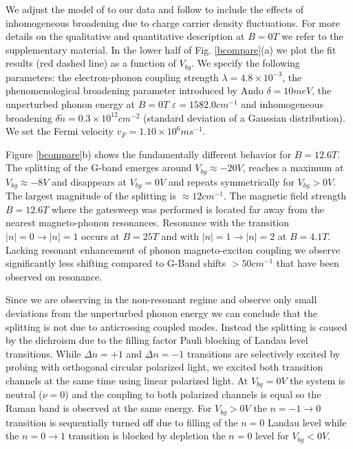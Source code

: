 \documentclass[prl,aps,superscriptaddress,showpacs,reprint]{revtex4-1}
\begin{document}
We adjust the model of \cite{tsuneya2006anomaly} to our data and follow \cite{yan2007electric} to include the effects of inhomogeneous broadening due to charge carrier density fluctuations. For more details on the qualitative and quantitative description at $B=0T$ we refer to the supplementary material. In the lower half of Fig. \ref{bcompare}(a) we plot the fit results (red dashed line) as a function of $V_{bg}$. We specify the following parameters: the electron-phonon coupling strength $\lambda = 4.8\times 10^{-3}$, the phenomenological broadening parameter introduced by Ando \cite{tsuneya2006anomaly} $\delta=10meV$, the unperturbed phonon energy at $B=0T$ $\varepsilon=1582.0cm^{-1}$ and inhomogeneous broadening $\delta \widetilde{n}=0.3\times 10^{12}cm^{-2}$ (standard deviation of a Gaussian distribution). We set the Fermi velocity $v_F=1.10\times 10^6ms^{-1}$.

Figure \ref{bcompare}b) shows the fundamentally different behavior for $B=12.6T$. 
The splitting of the G-band emerges around $V_{bg} \approx -20V$, reaches a maximum at $V_{bg} \approx -8V$ and disappears at $V_{bg} = 0V$ and repeats symmetrically for $V_{bg}>0V$. The largest magnitude of the splitting is $\approx 12cm^{-1}$. The magnetic field strength $B=12.6T$ where the gatesweep was performed is located far away from the nearest magneto-phonon resonances. Resonance with the transition $\left|n\right|=0 \rightarrow \left|n\right|=1$ occurs at $B=25T$ and with $\left|n\right|=1 \rightarrow \left|n\right|=2$ at $B=4.1T$. Lacking resonant enhancement of phonon magneto-exciton coupling we observe significantly less shifting compared to G-Band shifts $>50cm^{-1}$ that have been observed on resonance. 

Since we are observing in the non-resonant regime and observe only small deviations from the unperturbed phonon energy we can conclude that the splitting is not due to anticrossing coupled modes. Instead the splitting is caused by the dichroism due to the filling factor Pauli blocking of Landau level transitions. While $\Delta n=+1$ and $\Delta n=-1$ transitions are selectively excited by probing with orthogonal circular polarized light, we excited both transition channels at the same time using linear polarized light. At $V_{bg}=0V$ the system is neutral ($\nu=0$) and the coupling to both polarized channels is equal so the Raman band is observed at the same energy. For $V_{bg}>0V$ the $n=-1\rightarrow 0$ transition is sequentially turned off due to filling of the $n=0$ Landau level while the $n=0\rightarrow 1$ transition is blocked by depletion the $n=0$ level for $V_{bg}<0V$. 
\end{document}

